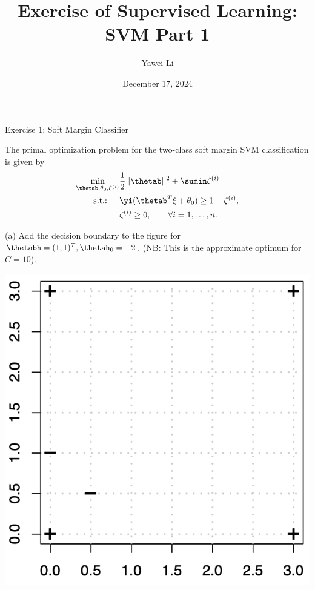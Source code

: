 \documentclass[aspectratio=169]{beamer}
\title[]{\textbf{Exercise of Supervised Learning: \\ SVM Part 1}}
\author{Yawei Li}
\institute[LMU]
{
\\
  \texttt{yawei.li@stat.uni-muenchen.de}
}
\date{December 17, 2024}
\newcommand{\zetai}{\zeta^{(i)}}
\begin{document}
\begin{frame}
\titlepage

\end{frame}

\begin{frame}{Exercise 1: Soft Margin Classifier}

The primal optimization problem for the two-class soft margin SVM classification is given by 
\begin{align*}
	\min_{\thetab, \theta_0, \zetai} & \frac{1}{2} ||\thetab||^2 + \sumin \zetai \\	
	\text{s.t.: }\quad & \yi (\thetab^T \xi + \theta_0) \geq 1 - \zetai, \\
	& \zetai \geq 0, \qquad \forall i= 1, \ldots, n.
\end{align*}

\begin{adjustbox}{valign=t}
	\begin{minipage}[t]{0.49\textwidth}
		(a) Add the decision boundary to the figure for $\thetabh = (1, 1)^T, \thetah_0 = -2$. (NB: This is the approximate optimum for $C = 10$).
	\end{minipage}
\end{adjustbox}
\hfill
\begin{adjustbox}{valign=t}
	\begin{minipage}{0.49\textwidth}
		\centering
		\includegraphics[width=0.6\columnwidth]{figures/ex_1_question.png}
	\end{minipage}

\end{adjustbox}

\end{frame}
\end{document}
